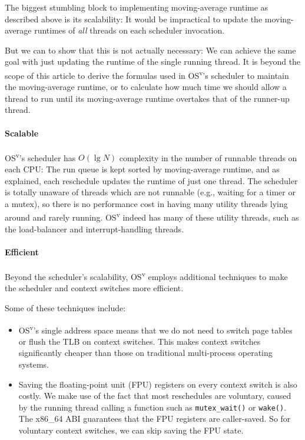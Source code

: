 \documentclass{sig-alternate}
\begin{document}
The biggest stumbling block to implementing moving-average runtime as
described above is its scalability: It would be impractical to update the
moving-average runtimes of \emph{all} threads on each scheduler invocation.

But we can to show that this is not actually necessary:
We can achieve the same goal with just updating the runtime of the
single running thread. It is beyond the scope of this
article to derive the formulas used in OS\textsuperscript{v}'s scheduler to maintain the
moving-average runtime, or to calculate how much time we should allow
a thread to run until its moving-average runtime overtakes that of the
runner-up thread.


\paragraph{Scalable}
OS\textsuperscript{v}'s scheduler has $O(\lg N)$ complexity in the number of runnable
threads on each CPU: The run queue is kept sorted by moving-average
runtime, and as explained, each reschedule updates the
runtime of just one thread. The scheduler is totally unaware of threads
which are not runnable (e.g., waiting for a timer or a mutex), so there
is no performance cost in having many utility threads lying around and rarely running. OS\textsuperscript{v}
indeed has many of these utility threads, such as the load-balancer and interrupt-handling threads.

\paragraph{Efficient}
Beyond the scheduler's scalability, OS\textsuperscript{v} employs additional techniques to
make the scheduler and context switches more efficient.

Some of these techniques include:

\begin{itemize}
  \item OS\textsuperscript{v}'s single address space means that we do not need to switch page tables
or flush the TLB on context switches. This makes context switches significantly cheaper
than those on traditional multi-process operating systems.

\item Saving the floating-point unit (FPU) registers on every context
switch is also costly. We make use of the fact that most reschedules are
voluntary, caused by the running thread calling a function such as
{\tt mutex\_wait()} or {\tt wake()}. The x86\_64 ABI guarantees that the FPU
registers are caller-saved. So for voluntary context switches, we can skip saving the FPU state.
\end{itemize}
\end{document}
